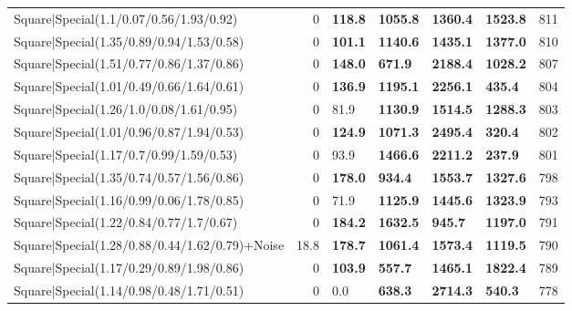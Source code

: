\begin{tabular}{lrllllr}
 Square|Special(1.1/0.07/0.56/1.93/0.92)                       &             0   & \textbf{118.8} & \textbf{1055.8} & \textbf{1360.4} & \textbf{1523.8} &          811 \\
 Square|Special(1.35/0.89/0.94/1.53/0.58)                      &             0   & \textbf{101.1} & \textbf{1140.6} & \textbf{1435.1} & \textbf{1377.0} &          810 \\
 Square|Special(1.51/0.77/0.86/1.37/0.86)                      &             0   & \textbf{148.0} & \textbf{671.9}  & \textbf{2188.4} & \textbf{1028.2} &          807 \\
 Square|Special(1.01/0.49/0.66/1.64/0.61)                      &             0   & \textbf{136.9} & \textbf{1195.1} & \textbf{2256.1} & \textbf{435.4}  &          804 \\
 Square|Special(1.26/1.0/0.08/1.61/0.95)                       &             0   & 81.9           & \textbf{1130.9} & \textbf{1514.5} & \textbf{1288.3} &          803 \\
 Square|Special(1.01/0.96/0.87/1.94/0.53)                      &             0   & \textbf{124.9} & \textbf{1071.3} & \textbf{2495.4} & \textbf{320.4}  &          802 \\
 Square|Special(1.17/0.7/0.99/1.59/0.53)                       &             0   & 93.9           & \textbf{1466.6} & \textbf{2211.2} & \textbf{237.9}  &          801 \\
 Square|Special(1.35/0.74/0.57/1.56/0.86)                      &             0   & \textbf{178.0} & \textbf{934.4}  & \textbf{1553.7} & \textbf{1327.6} &          798 \\
 Square|Special(1.16/0.99/0.06/1.78/0.85)                      &             0   & 71.9           & \textbf{1125.9} & \textbf{1445.6} & \textbf{1323.9} &          793 \\
 Square|Special(1.22/0.84/0.77/1.7/0.67)                       &             0   & \textbf{184.2} & \textbf{1632.5} & \textbf{945.7}  & \textbf{1197.0} &          791 \\
 Square|Special(1.28/0.88/0.44/1.62/0.79)+Noise                &            18.8 & \textbf{178.7} & \textbf{1061.4} & \textbf{1573.4} & \textbf{1119.5} &          790 \\
 Square|Special(1.17/0.29/0.89/1.98/0.86)                      &             0   & \textbf{103.9} & \textbf{557.7}  & \textbf{1465.1} & \textbf{1822.4} &          789 \\
 Square|Special(1.14/0.98/0.48/1.71/0.51)                      &             0   & 0.0            & \textbf{638.3}  & \textbf{2714.3} & \textbf{540.3}  &          778 \\

\end{tabular}
